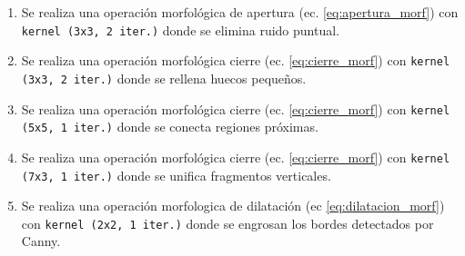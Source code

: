     
    
    

\begin{enumerate}
    \item Se realiza una operación morfológica de apertura (ec. \ref{eq:apertura_morf}) con \texttt{kernel (3x3, 2 iter.)} donde se elimina ruido puntual. %
    \item Se realiza una operación morfológica cierre (ec. \ref{eq:cierre_morf}) con \texttt{kernel (3x3, 2 iter.)} donde se rellena huecos pequeños.  
    \item Se realiza una operación morfológica cierre (ec. \ref{eq:cierre_morf}) con \texttt{kernel (5x5, 1 iter.)} donde se conecta regiones próximas.
    \item Se realiza una operación morfológica cierre (ec. \ref{eq:cierre_morf}) con \texttt{kernel (7x3, 1 iter.)} donde se unifica fragmentos verticales.
    \item Se realiza una operación morfologica de dilatación (ec \ref{eq:dilatacion_morf}) con \texttt{kernel (2x2, 1 iter.)} donde se engrosan los bordes detectados por Canny.
\end{enumerate}


